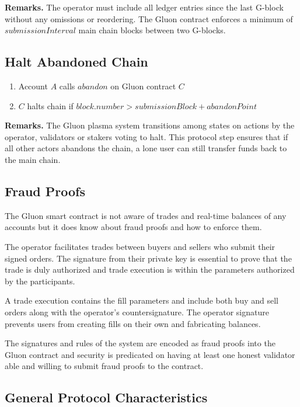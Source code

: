 \documentclass[12pt,a4paper]{article}
\begin{document}
\textbf{Remarks.} The operator must include all ledger entries since the last G-block without any omissions or reordering. The Gluon contract enforces a minimum  of $submissionInterval$ main chain blocks between two G-blocks.

\subsection{Halt Abandoned Chain}\label{gp:abandon}
\begin{mdframed}
\begin{enumerate}
    \item Account $A$ calls $abandon$ on  Gluon contract $C$
    \item $C$ halts chain if \(block.number > submissionBlock + abandonPoint\)
\end{enumerate}
\end{mdframed}

\textbf{Remarks.} The Gluon plasma system transitions among states on actions by the operator, validators or stakers voting to halt. This protocol step ensures that if all other actors  abandons the chain, a lone user can still transfer funds back to the main chain.

\subsection{Fraud Proofs}
The Gluon smart contract is not aware of trades and real-time balances of any accounts but it does know about fraud proofs and how to enforce them.

The operator facilitates trades between buyers and sellers who submit their signed orders. The signature from their private key is essential to prove that the trade is duly authorized and trade execution is within the parameters authorized by the participants.

A trade execution contains the fill parameters and include both buy and sell orders along with the operator’s countersignature. The operator signature prevents users from creating fills on their own and fabricating balances.

The signatures and rules of the system are encoded as fraud proofs into the Gluon contract and security is predicated on having at least one honest validator able and willing to submit fraud proofs to the contract.

\subsection{General Protocol Characteristics}
\end{document}
